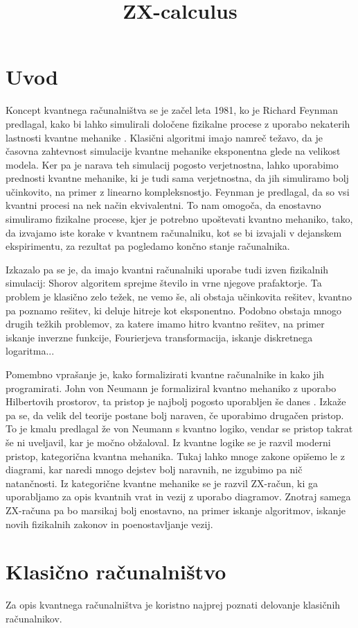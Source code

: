 \documentclass[mat1]{fmfdelo}
\title{ZX-calculus}
\begin{document}
\section{Uvod}
Koncept kvantnega računalništva se je začel leta 1981, ko je Richard Feynman predlagal, kako bi lahko simulirali določene fizikalne procese z uporabo nekaterih lastnosti kvantne mehanike \cite{feynmann}. Klasični algoritmi imajo namreč težavo, da je časovna zahtevnost simulacije kvantne mehanike eksponentna glede na velikost modela. Ker pa je narava teh simulacij pogosto verjetnostna, lahko uporabimo prednosti kvantne mehanike, ki je tudi sama verjetnostna, da jih simuliramo bolj učinkovito, na primer z linearno kompleksnostjo. Feynman je predlagal, da so vsi kvantni procesi na nek način ekvivalentni. To nam omogoča, da enostavno simuliramo fizikalne procese, kjer je potrebno upoštevati kvantno mehaniko, tako, da izvajamo iste korake v kvantnem računalniku, kot se bi izvajali v dejanskem ekspirimentu, za rezultat pa pogledamo končno stanje računalnika.

Izkazalo pa se je, da imajo kvantni računalniki uporabe tudi izven fizikalnih simulacij: Shorov algoritem sprejme število in vrne njegove prafaktorje. Ta problem je klasično zelo težek, ne vemo še, ali obstaja učinkovita rešitev, kvantno pa poznamo rešitev, ki deluje hitreje kot eksponentno. Podobno obstaja mnogo drugih težkih problemov, za katere imamo hitro kvantno rešitev, na primer iskanje inverzne funkcije, Fourierjeva transformacija, iskanje diskretnega logaritma...

Pomembno vprašanje je, kako formalizirati kvantne računalnike in kako jih programirati. John von Neumann je formaliziral kvantno mehaniko z uporabo Hilbertovih prostorov, ta pristop je najbolj pogosto uporabljen še danes \cite{neumann}. Izkaže pa se, da velik del teorije postane bolj naraven, če uporabimo drugačen pristop. To je kmalu predlagal že von Neumann s kvantno logiko, vendar se pristop takrat še ni uveljavil, kar je močno obžaloval. Iz kvantne logike se je razvil moderni pristop, kategorična kvantna mehanika. Tukaj lahko mnoge zakone opišemo le z diagrami, kar naredi mnogo dejstev bolj naravnih, ne izgubimo pa nič natančnosti. Iz kategorične kvantne mehanike se je razvil ZX-račun, ki ga uporabljamo za opis kvantnih vrat in vezij z uporabo diagramov. Znotraj samega ZX-računa pa bo marsikaj bolj enostavno, na primer iskanje algoritmov, iskanje novih fizikalnih zakonov in poenostavljanje vezij.

\section{Klasično računalništvo}
Za opis kvantnega računalništva je koristno najprej poznati delovanje klasičnih računalnikov. 
\end{document}
